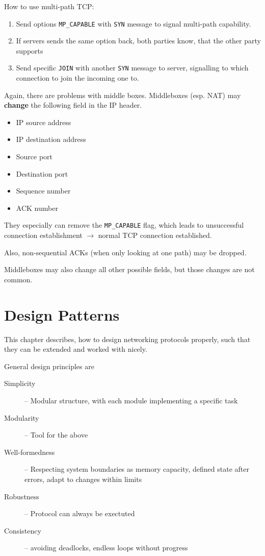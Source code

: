 \documentclass[english]{panikzettel}
\begin{document}
	How to use multi-path TCP:
	\begin{enumerate}
		\item Send options \texttt{MP\_CAPABLE} with \texttt{SYN} message to signal multi-path capability.
		\item If servers sends the same option back, both parties know, that the other party supports 
		\item Send specific \texttt{JOIN} with another \texttt{SYN} message to server, signalling to which connection to join the incoming one to.
	\end{enumerate}

	Again, there are problems with middle boxes.
	Middleboxes (esp. NAT) may \textbf{change} the following field in the IP header.
	\begin{itemize}
		\item IP source address
		\item IP destination address
		\item Source port
		\item Destination port
		\item Sequence number 
		\item ACK number
	\end{itemize}
	They especially can remove the \texttt{MP\_CAPABLE} flag, which leads to unsuccessful connection establishment \( \rightarrow \) normal TCP connection established.

	Also, non-sequential ACKs (when only looking at one path) may be dropped.
	
	Middleboxes may also change all other possible fields, but those changes are not common.
		
	\section{Design Patterns}
	\label{design-patterns}
	
	This chapter describes, how to design networking protocols properly, such that they can be extended and worked with nicely. 

	General design principles are
	\begin{description}
		\item[Simplicity] – Modular structure, with each module implementing a specific task
		\item[Modularity] – Tool for the above
		\item[Well-formedness] – Respecting system boundaries as memory capacity, defined state after errors, adapt to changes within limits
		\item[Robustness] – Protocol can always be exectuted
		\item[Consistency] – avoiding deadlocks, endless loops without progress
	\end{description}
\end{document}
